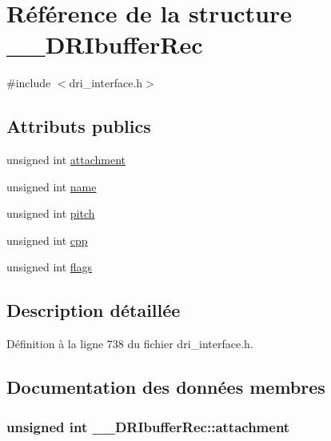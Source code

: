 \hypertarget{struct_____d_r_ibuffer_rec}{\section{Référence de la structure \-\_\-\-\_\-\-D\-R\-Ibuffer\-Rec}
\label{struct_____d_r_ibuffer_rec}
}


{\ttfamily \#include $<$dri\-\_\-interface.\-h$>$}

\subsection*{Attributs publics}
\begin{DoxyCompactItemize}
\item 
unsigned int \hyperlink{struct_____d_r_ibuffer_rec_aa7c5162b98faab916773747f6049f2aa}{attachment}
\item 
unsigned int \hyperlink{struct_____d_r_ibuffer_rec_a7b6270c8073fcd89d9c1f0a2e1484a55}{name}
\item 
unsigned int \hyperlink{struct_____d_r_ibuffer_rec_a3ca39b391b5c70991eceecfe24680d01}{pitch}
\item 
unsigned int \hyperlink{struct_____d_r_ibuffer_rec_ae4229532ca9a93caf4e3a548d2591255}{cpp}
\item 
unsigned int \hyperlink{struct_____d_r_ibuffer_rec_ab0bf0cf0495bc1d86b152b9236245c06}{flags}
\end{DoxyCompactItemize}


\subsection{Description détaillée}


Définition à la ligne 738 du fichier dri\-\_\-interface.\-h.



\subsection{Documentation des données membres}
\hypertarget{struct_____d_r_ibuffer_rec_aa7c5162b98faab916773747f6049f2aa}{
\subsubsection[{attachment}]{\setlength{\rightskip}{0pt plus 5cm}unsigned int \-\_\-\-\_\-\-D\-R\-Ibuffer\-Rec\-::attachment}}\label{struct_____d_r_ibuffer_rec_aa7c5162b98faab916773747f6049f2aa}


